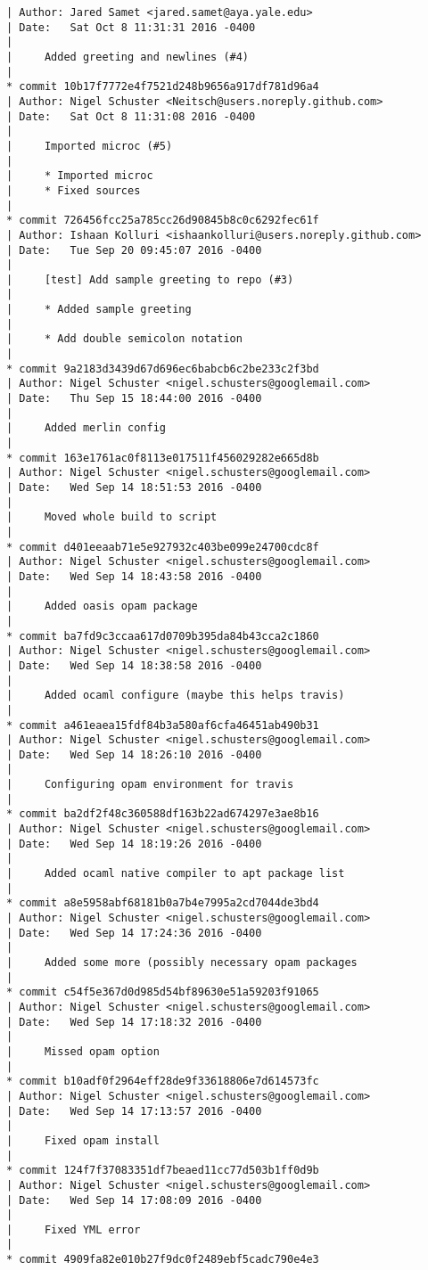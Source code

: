 \begin{lstlisting}
| Author: Jared Samet <jared.samet@aya.yale.edu>
| Date:   Sat Oct 8 11:31:31 2016 -0400
| 
|     Added greeting and newlines (#4)
|  
* commit 10b17f7772e4f7521d248b9656a917df781d96a4
| Author: Nigel Schuster <Neitsch@users.noreply.github.com>
| Date:   Sat Oct 8 11:31:08 2016 -0400
| 
|     Imported microc (#5)
|     
|     * Imported microc
|     * Fixed sources
|  
* commit 726456fcc25a785cc26d90845b8c0c6292fec61f
| Author: Ishaan Kolluri <ishaankolluri@users.noreply.github.com>
| Date:   Tue Sep 20 09:45:07 2016 -0400
| 
|     [test] Add sample greeting to repo (#3)
|     
|     * Added sample greeting
|     
|     * Add double semicolon notation
|  
* commit 9a2183d3439d67d696ec6babcb6c2be233c2f3bd
| Author: Nigel Schuster <nigel.schusters@googlemail.com>
| Date:   Thu Sep 15 18:44:00 2016 -0400
| 
|     Added merlin config
|  
* commit 163e1761ac0f8113e017511f456029282e665d8b
| Author: Nigel Schuster <nigel.schusters@googlemail.com>
| Date:   Wed Sep 14 18:51:53 2016 -0400
| 
|     Moved whole build to script
|  
* commit d401eeaab71e5e927932c403be099e24700cdc8f
| Author: Nigel Schuster <nigel.schusters@googlemail.com>
| Date:   Wed Sep 14 18:43:58 2016 -0400
| 
|     Added oasis opam package
|  
* commit ba7fd9c3ccaa617d0709b395da84b43cca2c1860
| Author: Nigel Schuster <nigel.schusters@googlemail.com>
| Date:   Wed Sep 14 18:38:58 2016 -0400
| 
|     Added ocaml configure (maybe this helps travis)
|  
* commit a461eaea15fdf84b3a580af6cfa46451ab490b31
| Author: Nigel Schuster <nigel.schusters@googlemail.com>
| Date:   Wed Sep 14 18:26:10 2016 -0400
| 
|     Configuring opam environment for travis
|  
* commit ba2df2f48c360588df163b22ad674297e3ae8b16
| Author: Nigel Schuster <nigel.schusters@googlemail.com>
| Date:   Wed Sep 14 18:19:26 2016 -0400
| 
|     Added ocaml native compiler to apt package list
|  
* commit a8e5958abf68181b0a7b4e7995a2cd7044de3bd4
| Author: Nigel Schuster <nigel.schusters@googlemail.com>
| Date:   Wed Sep 14 17:24:36 2016 -0400
| 
|     Added some more (possibly necessary opam packages
|  
* commit c54f5e367d0d985d54bf89630e51a59203f91065
| Author: Nigel Schuster <nigel.schusters@googlemail.com>
| Date:   Wed Sep 14 17:18:32 2016 -0400
| 
|     Missed opam option
|  
* commit b10adf0f2964eff28de9f33618806e7d614573fc
| Author: Nigel Schuster <nigel.schusters@googlemail.com>
| Date:   Wed Sep 14 17:13:57 2016 -0400
| 
|     Fixed opam install
|  
* commit 124f7f37083351df7beaed11cc77d503b1ff0d9b
| Author: Nigel Schuster <nigel.schusters@googlemail.com>
| Date:   Wed Sep 14 17:08:09 2016 -0400
| 
|     Fixed YML error
|  
* commit 4909fa82e010b27f9dc0f2489ebf5cadc790e4e3

\end{lstlisting}
